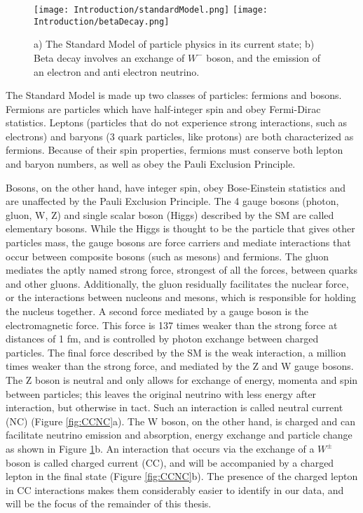 \begin{figure}[h!]
\centering
\texttt{[image: Introduction/standardModel.png]}
\hspace{6 mm}
\texttt{[image: Introduction/betaDecay.png]}
\caption{a) The Standard Model of particle physics in its current state; b) Beta decay involves an exchange of $W^-$ boson, and the emission of an electron and anti electron neutrino. }
\label{fig:SM}
\end{figure}
\par The Standard Model is made up two classes of particles: fermions and bosons. Fermions are particles which have half-integer spin and obey Fermi-Dirac statistics. Leptons (particles that do not experience strong interactions, such as electrons) and baryons (3 quark particles, like protons) are both characterized as fermions. Because of their spin properties, fermions must conserve both lepton and baryon numbers, as well as obey the Pauli Exclusion Principle. 
\par Bosons, on the other hand, have integer spin, obey Bose-Einstein statistics and are unaffected by the Pauli Exclusion Principle. The 4 gauge bosons (photon, gluon, W, Z) and single scalar boson (Higgs) described by the SM are called elementary bosons. While the Higgs is thought to be the particle that gives other particles mass, the gauge bosons are force carriers and mediate interactions that occur between composite bosons (such as mesons) and fermions.  The gluon mediates the aptly named strong force, strongest of all the forces, between quarks and other gluons. Additionally, the gluon residually facilitates the nuclear force, or the interactions between nucleons and mesons, which is responsible for holding the nucleus together. A second force mediated by a gauge boson is the electromagnetic force.  This force is 137 times weaker than the strong force at distances of 1 fm, and is controlled by photon exchange between charged particles. The final force described by the SM is the weak interaction, a million times weaker than the strong force, and mediated by the Z and W gauge bosons. The Z boson is neutral and only allows for exchange of energy, momenta and spin between particles; this leaves the original neutrino with less energy after interaction, but otherwise in tact. Such an interaction is called neutral current (NC) (Figure \ref{fig:CCNC}a). The W boson, on the other hand, is charged and can facilitate neutrino emission and absorption, energy exchange and particle change as shown in Figure \ref{fig:SM}b.  An interaction that occurs via the exchange of a $W^\pm$ boson is called charged current (CC), and will be accompanied by a charged lepton in the final state (Figure \ref{fig:CCNC}b). The presence of the charged lepton in CC interactions makes them considerably easier to identify in our data, and will be the focus of the remainder of this thesis. 

